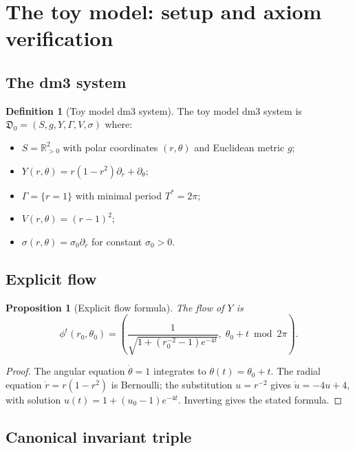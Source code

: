 \documentclass[reqno]{amsart}
\numberwithin{equation}{section}
\theoremstyle{plain}
\newtheorem{proposition}[theorem]{Proposition}
\theoremstyle{definition}
\newtheorem{definition}[theorem]{Definition}
\theoremstyle{remark}
\newcommand{\R}{\mathbb{R}}
\newcommand{\dm}{\mathfrak{D}}
\newcommand{\Orb}{\Gamma}
\begin{document}
\section{The toy model: setup and axiom verification}\label{sec:setup}

\subsection{The dm3 system}

\begin{definition}[Toy model dm3 system]\label{def:toy}
The toy model dm3 system is
$\dm_0=(S,g,Y,\Orb,V,\sigma)$ where:
\begin{itemize}[leftmargin=*]
  \item $S=\R^2_{>0}$ with polar coordinates $(r,\theta)$ and
        Euclidean metric $g$;
  \item $Y(r,\theta)=r(1-r^2)\partial_r+\partial_\theta$;
  \item $\Orb=\{r=1\}$ with minimal period $T^*=2\pi$;
  \item $V(r,\theta)=(r-1)^2$;
  \item $\sigma(r,\theta)=\sigma_0\partial_r$ for constant $\sigma_0>0$.
\end{itemize}
\end{definition}

\subsection{Explicit flow}

\begin{proposition}[Explicit flow formula]\label{prop:flow}
The flow of $Y$ is
\[
  \phi^t(r_0,\theta_0) =
  \left(\frac{1}{\sqrt{1+(r_0^{-2}-1)e^{-4t}}},\;
  \theta_0 + t\bmod 2\pi\right).
\]
\end{proposition}
\begin{proof}
The angular equation $\dot\theta=1$ integrates to $\theta(t)=\theta_0+t$.
The radial equation $\dot r=r(1-r^2)$ is Bernoulli; the substitution
$u=r^{-2}$ gives $\dot u=-4u+4$, with solution
$u(t)=1+(u_0-1)e^{-4t}$. Inverting gives the stated formula.
\end{proof}

\subsection{Canonical invariant triple}
\end{document}
